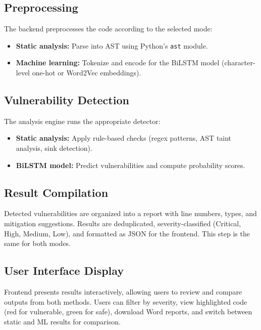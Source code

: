 \subsection{Preprocessing}
\label{sec:workflow_preprocessing}

The backend preprocesses the code according to the selected mode:
\begin{itemize}
	\item \textbf{Static analysis:} Parse into AST using Python's \texttt{ast} module.
	\item \textbf{Machine learning:} Tokenize and encode for the BiLSTM model (character-level one-hot or Word2Vec embeddings).
\end{itemize}

\subsection{Vulnerability Detection}
\label{sec:workflow_detection}

The analysis engine runs the appropriate detector:
\begin{itemize}
	\item \textbf{Static analysis:} Apply rule-based checks (regex patterns, AST taint analysis, sink detection).
	\item \textbf{BiLSTM model:} Predict vulnerabilities and compute probability scores.
\end{itemize}

\subsection{Result Compilation}
\label{sec:workflow_compilation}

Detected vulnerabilities are organized into a report with line numbers, types, and mitigation suggestions. Results are deduplicated, severity-classified (Critical, High, Medium, Low), and formatted as JSON for the frontend. This step is the same for both modes.

\subsection{User Interface Display}
\label{sec:workflow_display}

Frontend presents results interactively, allowing users to review and compare outputs from both methods. Users can filter by severity, view highlighted code (red for vulnerable, green for safe), download Word reports, and switch between static and ML results for comparison.
